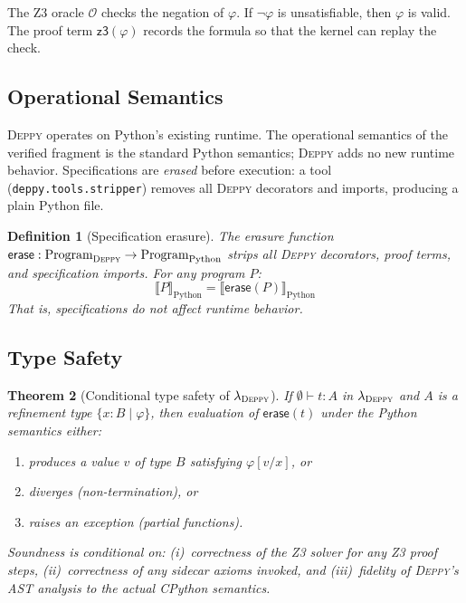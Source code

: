 \documentclass[acmsmall,nonacm,screen]{acmart}
\newtheorem{theorem}{Theorem}[section]
\newtheorem{definition}[theorem]{Definition}
\newcommand{\deppy}{\textsc{Deppy}}
\newcommand{\syntype}[1]{\ensuremath{\mathsf{#1}}}
\newcommand{\reftype}[3]{\{#1 : #2 \mid #3\}}
\newcommand{\jdg}[3]{#1 \vdash #2 : #3}
\newcommand{\sem}[1]{\llbracket #1 \rrbracket}
\begin{document}
The Z3 oracle $\mathcal{O}$ checks the negation of $\varphi$.  If
$\neg\varphi$ is unsatisfiable, then $\varphi$ is valid.  The proof
term $\syntype{z3}(\varphi)$ records the formula so that the kernel
can replay the check.

\subsection{Operational Semantics}

\deppy{} operates on Python's existing runtime.  The operational
semantics of the verified fragment is the standard Python semantics;
\deppy{} adds no new runtime behavior.  Specifications are
\emph{erased} before execution: a tool
(\texttt{deppy.tools.stripper}) removes all \deppy{} decorators and
imports, producing a plain Python file.

\begin{definition}[Specification erasure]
The erasure function $\mathsf{erase} : \text{Program}_{\deppy} \to \text{Program}_{\text{Python}}$
strips all \deppy{} decorators, proof terms, and specification
imports.  For any program $P$:
\[
  \sem{P}_{\text{Python}} = \sem{\mathsf{erase}(P)}_{\text{Python}}
\]
That is, specifications do not affect runtime behavior.
\end{definition}

\subsection{Type Safety}

\begin{theorem}[Conditional type safety of $\lambda_{\deppy}$]\label{thm:safety}
If\/ $\jdg{\emptyset}{t}{A}$ in $\lambda_{\deppy}$ and $A$ is a
refinement type $\reftype{x}{B}{\varphi}$, then evaluation of
$\mathsf{erase}(t)$ under the Python semantics either:
\begin{enumerate}
\item produces a value $v$ of type $B$ satisfying $\varphi[v/x]$, or
\item diverges (non-termination), or
\item raises an exception (partial functions).
\end{enumerate}
Soundness is conditional on: (i)~correctness of the Z3 solver for
any \textsc{Z3} proof steps, (ii)~correctness of any sidecar axioms
invoked, and (iii)~fidelity of \deppy{}'s AST analysis to the actual
CPython semantics.
\end{theorem}
\end{document}
